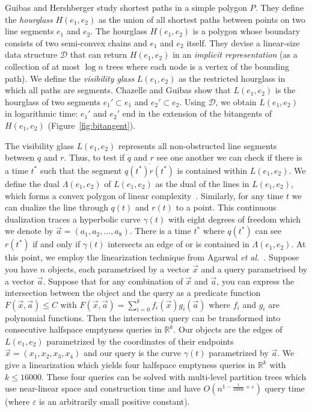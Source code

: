 \documentclass[a4paper, UKenglish]{lipics-v2018}
\newcommand{\etal}{\textit{et al.}\xspace}
\begin{document}
Guibas and Hershberger \cite{guibas1989optimal} study shortest paths in a simple polygon $P$. 
They define the \emph{hourglass} $H(e_1, e_2)$ as the union of all shortest paths between points on two line segments $e_1$ and $e_2$. The hourglass $H(e_1, e_2)$ is a polygon whose boundary consists of two semi-convex chains and $e_1$ and $e_2$ itself. They devise a linear-size data structure $\mathcal{D}$ that can return $H(e_1, e_2)$ in an \emph{implicit representation} (as a collection of at most $\log n$ trees where each node is a vertex of the bounding path).
We define the \emph{visibility glass} $L(e_1, e_2)$ as the restricted hourglass in which all paths are segments. Chazelle and Guibas \cite{Chazelle1989} show that $L(e_1, e_2)$ is the hourglass of two segments $e_1' \subset e_1$ and $e_2' \subset e_2$.
Using $\mathcal{D}$, we obtain $L(e_1, e_2)$ in logarithmic time: 
$e_1'$ and $e_2'$ end in the 
extension of the bitangents of $H(e_1, e_2)$
(Figure~\ref{fig:bitangent}).

The visibility glass $L(e_1, e_2)$ represents all non-obstructed line segments between $q$ and $r$. Thus, to test if $q$ and $r$ see one another we can check if there is a time $t^*$ such that the segment $\overline{q(t^*)r(t^*)}$ is contained within $L(e_1, e_2)$. %
We define the dual $\Lambda(e_1, e_2)$ of $L(e_1, e_2)$ as the dual of the lines in $L(e_1, e_2)$, which forms a convex polygon of linear complexity~\cite{Chazelle1989}. 
Similarly, for any time $t$ we can dualize the line through $q(t)$ and $r(t)$ to a point. This continuous dualization traces a hyperbolic curve $\gamma(t)$ with eight degrees of freedom which we denote by $\vec{a} = (a_1, a_2, \ldots, a_8)$. There is a time $t^*$ where $q(t^*)$ can see $r(t^*)$ if and only if $\gamma(t)$ intersects an edge of or is contained in $\Lambda(e_1, e_2)$. At this point, we employ the linearization technique from Agarwal \etal ~\cite{agarwal2013range}. Suppose you have $n$ objects, each parametrised by a vector $\vec{x}$ and a query parametrised by a vector $\vec{a}$. Suppose that for any combination of $\vec{x}$ and $\vec{a}$, you can express the intersection between the object and the query as a predicate function $F(\vec{x}, \vec{a}) \le C$ with $F(\vec{x},\vec{a}) = \sum_{i=0}^k f_i(\vec{x})g_i(\vec{a})$ where $f_i$ and $g_i$ are polynomial functions. Then the intersection query can be transformed into consecutive halfspace emptyness queries in $\mathbb{R}^k$. Our objects are the edges of $L(e_1, e_2)$ parametrized by the coordinates of their endpoints $\vec{x} = (x_1, x_2, x_3, x_4)$ and our query is the curve $\gamma(t)$ parametrized by $\vec{a}$. We give a linearization which  yields four halfspace emptyness queries in $\mathbb{R}^k$ with $k \le 16000$. These four queries can be solved with multi-level partition trees which use near-linear space and construction time and have $O(n^{1 - \frac{1}{16000} + \varepsilon})$ query time (where $\varepsilon$ is an arbitrarily small positive constant).
\end{document}

